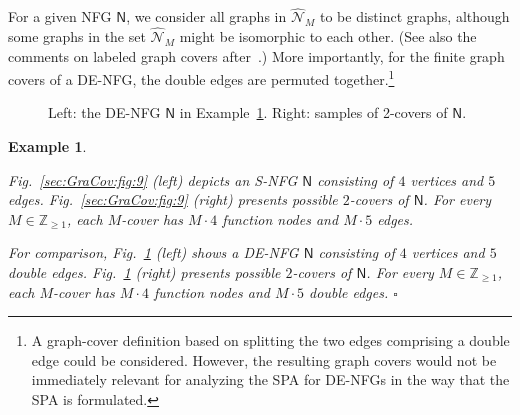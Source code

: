 \documentclass[journal]{IEEEtran}
\newcommand{\add}[1]{{\color{black}#1}}
\newtheorem{example}[theorem]{Example}
\newcommand{\manualendsymbol}[1]{%
  \leavevmode\unskip\penalty9999\hbox{}\nobreak\hfill
  \quad\hbox{#1}}
\newcommand{\eexample}{\manualendsymbol{\ensuremath{\square}}}
\newcommand{\set}[1]{\mathcal{#1}}
\newcommand{\graphN}{ \mathsf{N} }
\newcommand{\sZpp}{ \mathbb{Z}_{\geq 1} }
\begin{document}
For a given NFG $\mathsf{N}$, we consider all graphs in $\hat{\set{N}}_{M}$ to
be distinct graphs, although some graphs in the set $\hat{\set{N}}_{M}$ might
be isomorphic to each other. (See also the comments on labeled graph covers
after~\cite[Definition~19]{Vontobel2013}.) More importantly, for the finite
graph covers of a DE-NFG, the double edges are permuted together.\footnote{A
  graph-cover definition based on splitting the two edges comprising a double
  edge could be considered. However, the resulting graph covers would not be
  immediately relevant for analyzing the SPA for DE-NFGs in the way that the
  SPA is formulated.}

\begin{figure}[t]
  \begin{center}
    
    \medskip
    \caption{Left: the S-NFG $\graphN$ in Example~\ref{example:finite_graph_cover}.
      Right: samples of 2-covers
      of $\graphN$.\label{sec:GraCov:fig:9}}
    
    \medskip
    \caption{
      Left: the DE-NFG $\graphN$ in Example~\ref{example:finite_graph_cover}. Right: samples of 2-covers
      of $\graphN$.
    }\label{fig:Exam_Graph_cover_DE_NFG}

  \end{center}
\end{figure}

\begin{example}
  \label{example:finite_graph_cover}

  Fig.~\ref{sec:GraCov:fig:9} (left) depicts an S-NFG $\graphN$ consisting of $4$ vertices and $5$ edges. Fig.~\ref{sec:GraCov:fig:9} (right)
  presents possible $2$-covers of $\graphN$.
  \add{For every $ M \in \sZpp$, each $M$-cover has $M\cdot 4$ function nodes and}
  $M\cdot 5$ edges.

  For comparison,
  Fig.~\ref{fig:Exam_Graph_cover_DE_NFG} (left) shows a DE-NFG $\graphN$
  consisting of $4$ vertices and $5$ double edges.
  Fig.~\ref{fig:Exam_Graph_cover_DE_NFG} (right) presents possible $2$-covers of $\graphN$.
  \add{For every $ M \in \sZpp$, each $M$-cover}
  has $M\cdot 4$ function nodes and
  $M\cdot 5$ double edges.
  \eexample
\end{example}
\end{document}
